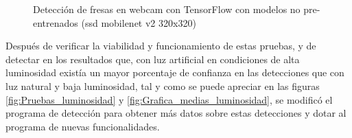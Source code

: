 \begin{figure}[H]
    \hspace{1mm}
    \hspace{1mm}
    
    \caption{Detección de fresas en webcam con TensorFlow con modelos no pre-entrenados (ssd mobilenet v2 320x320)}
    \label{fig:deteccion_Fresas_webcam_TF_ssdmobilenet}
\end{figure}

Después de verificar la viabilidad y funcionamiento de estas pruebas, y de detectar en los resultados que, con luz artificial en condiciones de alta luminosidad existía un mayor porcentaje de confianza en las detecciones que con luz natural y baja luminosidad, tal y como se puede apreciar en las figuras \ref{fig:Pruebas_luminosidad} y \ref{fig:Grafica_medias_luminosidad}, se modificó el programa de detección para obtener más datos sobre estas detecciones y dotar al programa de nuevas funcionalidades.

